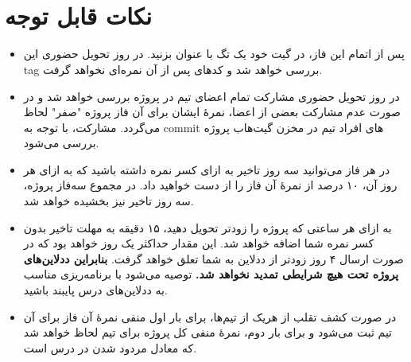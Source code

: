 \documentclass[]{article}
\begin{document}
\newpage
\pagestyle{fancy}
\fancyhf{}
\fancyfoot{}
\cfoot{\thepage}
\renewcommand{\headrulewidth}{2pt}

\KashidaOff



\tableofcontents

\newpage

 \Large \textbf{\\\\
}


\section*{{\titr نکات قابل توجه}}
\begin{itemize}
\item
پس از اتمام این فاز، در گیت خود یک تگ با عنوان  بزنید. در روز تحویل حضوری این tag بررسی خواهد شد و کدهای پس از آن نمره‌ای نخواهد گرفت.

\item
در روز تحویل حضوری مشارکت تمام اعضای تیم در پروژه بررسی خواهد‌ شد و در صورت عدم مشارکت بعضی از اعضا، نمرهٔ ایشان برای آن فاز پروژه "صفر" لحاظ می‌گردد. مشارکت، با توجه به commit های افراد تیم در مخزن گیت‌هاب پروژه بررسی می‌شود.

\item
در هر فاز می‌توانید سه روز تاخیر به ازای کسر نمره داشته‌ باشید که به ازای هر روز آن، ۱۰ درصد از نمرهٔ آن فاز را از دست خواهید‌ داد. در مجموع سه‌فاز پروژه، سه روز تاخیر نیز بخشیده خواهد‌ شد.

\item
به ازای هر ساعتی که پروژه را زودتر تحویل دهید، ۱۵ دقیقه به مهلت تاخیر بدون کسر نمره شما اضافه خواهد‌ شد. این مقدار حداکثر یک روز خواهد‌ بود که در صورت ارسال ۴ روز زودتر از ددلاین به شما تعلق خواهد گرفت. \textbf{بنابراین ددلاین‌های پروژه تحت هیچ شرایطی تمدید نخواهد‌ شد.} توصیه می‌شود با برنامه‌ریزی مناسب به ددلاین‌های درس پایبند باشید.

\item
در صورت کشف تقلب از هریک از تیم‌ها، برای بار اول منفی نمرهٔ آن فاز برای آن تیم ثبت می‌شود و برای بار دوم، نمرهٔ منفی کل پروژه برای تیم لحاظ خواهد‌ شد که معادل مردود شدن در درس است.
\end{itemize}
\end{document}
